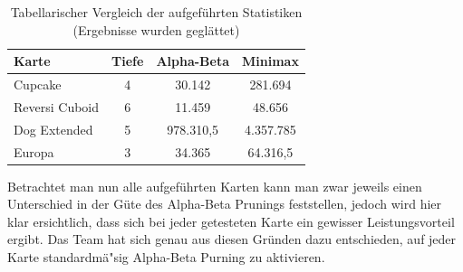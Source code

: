 \vspace{1em}
\begin{table}[!h]
    \centering
    \begin{tabular}{|l|c|c|c|}
        \hline
        \textbf{Karte} & \textbf{Tiefe} & \textbf{Alpha-Beta} & \textbf{Minimax}\\
        \hline
        Cupcake & 4 & 30.142 & 281.694\\
        \hline
        Reversi Cuboid & 6 & 11.459 & 48.656\\
        \hline
        Dog Extended & 5 & 978.310,5 & 4.357.785\\
        \hline
        Europa & 3 & 34.365 & 64.316,5\\
        \hline
    \end{tabular}
    \caption{Tabellarischer Vergleich der aufgef\"uhrten Statistiken (Ergebnisse wurden geglättet)}
    \label{tab:additional-search-depth}
\end{table}

Betrachtet man nun alle aufgef\"uhrten Karten kann man zwar jeweils einen Unterschied in der G\"ute des Alpha-Beta Prunings feststellen, jedoch wird hier klar ersichtlich, dass sich bei jeder getesteten Karte ein gewisser Leistungsvorteil ergibt.
Das Team hat sich genau aus diesen Gr\"unden dazu entschieden, auf jeder Karte standardm\"a"sig Alpha-Beta Purning zu aktivieren.

